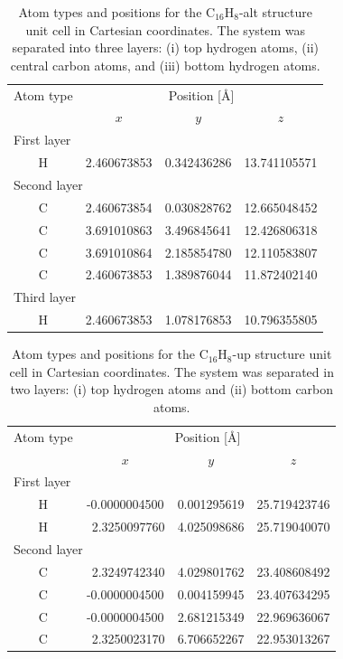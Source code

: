 \documentclass[pss]{wiley2sp} %
\begin{document}
\begin{table}[t]
\begin{tabular}{cccc}
\hline
Atom type &  \multicolumn{3}{c}{Position [\AA] } \\
\cline{2-4}
& $x$ & $y$ & $z$ \\
\hline
\multicolumn{2}{l}{First layer}\\
H & 2.460673853 & 0.342436286 & 13.741105571 \\
\multicolumn{2}{l}{Second layer}\\
C & 2.460673854 & 0.030828762 & 12.665048452 \\
C & 3.691010863 & 3.496845641 & 12.426806318 \\
C & 3.691010864 & 2.185854780 & 12.110583807 \\
C & 2.460673853 & 1.389876044 & 11.872402140 \\
\multicolumn{2}{l}{Third layer}\\
H & 2.460673853 & 1.078176853 & 10.796355805 \\
\hline
\end{tabular}
\caption[]{%
Atom types and positions for the C$_{16}$H$_{8}$-alt structure unit cell in
Cartesian coordinates. The system was separated into three layers: (i) top
hydrogen atoms, (ii) central carbon atoms, and (iii) bottom hydrogen atoms.
\label{tab:altstrc}}
\end{table}
\begin{table}[t]
\begin{tabular}{cccc}
\hline
Atom type &  \multicolumn{3}{c}{Position [\AA]} \\
\cline{2-4}
& $x$ & $y$ & $z$ \\
\hline
\multicolumn{2}{l}{First layer}\\
H &  -0.0000004500 & 0.001295619 & 25.719423746 \\
H & \ 2.3250097760 & 4.025098686 & 25.719040070 \\
\multicolumn{2}{l}{Second layer}\\
C & \ 2.3249742340 & 4.029801762 & 23.408608492 \\
C &  -0.0000004500 & 0.004159945 & 23.407634295 \\
C &  -0.0000004500 & 2.681215349 & 22.969636067 \\
C & \ 2.3250023170 & 6.706652267 & 22.953013267 \\
\hline
\end{tabular}
\caption[]{%
Atom types and positions for the C$_{16}$H$_{8}$-up structure unit cell in
Cartesian coordinates. The system was separated in two layers: (i) top
hydrogen atoms and (ii) bottom carbon atoms.}
\label{tab:upstrc}
\end{table}
\end{document}
